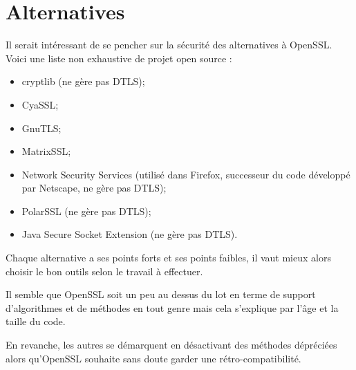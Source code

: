 \section{Alternatives}
Il serait intéressant de se pencher sur la sécurité des alternatives à OpenSSL. Voici une liste non exhaustive de projet open source :
\begin{itemize}
\item cryptlib (ne gère pas DTLS);
\item CyaSSL;
\item GnuTLS;
\item MatrixSSL;
\item Network Security Services	(utilisé dans Firefox, successeur du code développé par Netscape, ne gère pas DTLS);
\item PolarSSL (ne gère pas DTLS);
\item Java Secure Socket Extension (ne gère pas DTLS).
\end{itemize}

Chaque alternative a ses points forts et ses points faibles, il vaut mieux alors choisir le bon outils selon le travail à effectuer.

Il semble que OpenSSL soit un peu au dessus du lot en terme de support d'algorithmes et de méthodes en tout genre mais cela s'explique par l'âge et la taille du code. 

En revanche, les autres se démarquent en désactivant des méthodes dépréciées alors qu'OpenSSL souhaite sans doute garder une rétro-compatibilité.